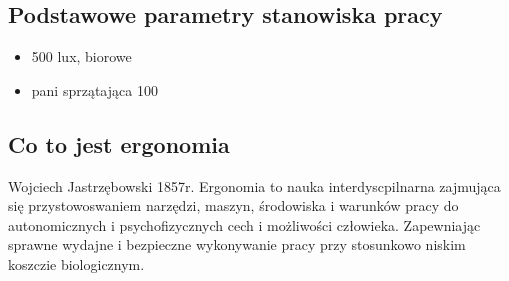 \documentclass[11pt]{article}
\begin{document}
\subsection{Podstawowe parametry stanowiska pracy}
\label{sec:orgcd57e41}
\begin{itemize}
\item 500 lux, biorowe
\item pani sprzątająca 100
\end{itemize}
\subsection{Co to jest ergonomia}
\label{sec:org9997942}
Wojciech Jastrzębowski 1857r.
Ergonomia to nauka interdyscpilnarna zajmująca się przystowoswaniem narzędzi, maszyn, środowiska i warunków pracy do autonomicznych i psychofizycznych cech i możliwości człowieka.
Zapewniając sprawne wydajne i bezpieczne wykonywanie pracy przy stosunkowo niskim koszczie biologicznym.
\end{document}
